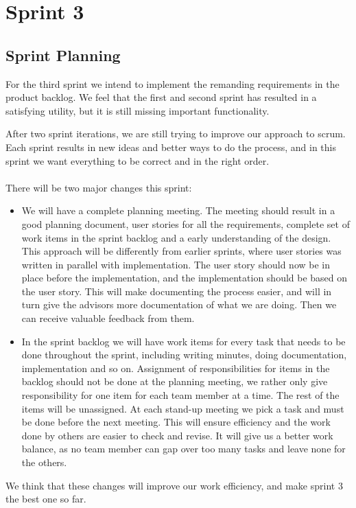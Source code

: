 \chapter{Sprint 3}


\section{Sprint Planning}
For the third sprint we intend to implement the remanding requirements in the product backlog. We feel that the first and second sprint has resulted in a satisfying \gls{utility}, but it is still missing important functionality.

After two sprint iterations, we are still trying to improve our approach to \Gls{scrum}. Each sprint results in new ideas and better ways to do the process, and in this sprint we want everything to be correct and in the right order.\\
\\
There will be two major changes this sprint:
\begin {itemize}
\item We will have a complete planning meeting. The meeting should result in a good planning document, user stories for all the requirements, complete set of work items in the sprint backlog and a early understanding of the design. This approach will be differently from earlier sprints, where user stories was written in parallel with implementation. The user story should now be in place before the implementation, and the implementation should be based on the user story. This will make documenting the process easier, and will in turn give the advisors more documentation of what we are doing. Then we can receive valuable feedback from them.

\item In the sprint backlog we will have work items for every task that needs to be done throughout the sprint, including writing minutes, doing documentation, implementation and so on.  Assignment of responsibilities for items in the backlog should not be done at the planning meeting, we rather only give responsibility for one item for each team member at a time. The rest of the items will be unassigned. At each stand-up meeting we pick a task and must be done before the next meeting. This will ensure efficiency and the work done by others are easier to check and revise. It will give us a better work balance, as no team member can gap over too many tasks and leave none for the others.
\end{itemize}
We think that these changes will improve our work efficiency, and make sprint 3 the best one so far.


